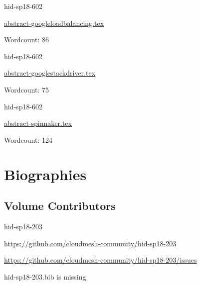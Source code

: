 

\begin{IU}

hid-sp18-602

\href{https://github.com/cloudmesh-community/hid-sp18-602/blob/master//technology/abstract-googleloadbalancing.tex}{abstract-googleloadbalancing.tex}

 

Wordcount: 86

\end{IU}



\begin{IU}

hid-sp18-602

\href{https://github.com/cloudmesh-community/hid-sp18-602/blob/master//technology/abstract-googlestackdriver.tex}{abstract-googlestackdriver.tex}

 

Wordcount: 75

\end{IU}



\begin{IU}

hid-sp18-602

\href{https://github.com/cloudmesh-community/hid-sp18-602/blob/master//technology/abstract-spinnaker.tex}{abstract-spinnaker.tex}

 

Wordcount: 124

\end{IU}

\part{Biographies}
\chapter{Volume Contributors}


\begin{IU}

hid-sp18-203

\url{https://github.com/cloudmesh-community/hid-sp18-203}

\url{https://github.com/cloudmesh-community/hid-sp18-203/issues}

hid-sp18-203.bib is missing

\end{IU}


